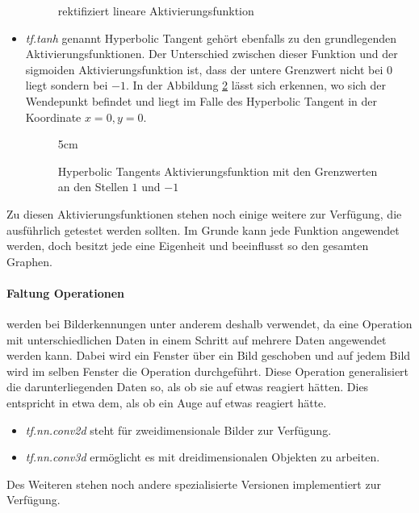 \begin{itemize}
\begin{figure}[ht!]
{
	}
	\caption{rektifiziert lineare Aktivierungsfunktion}
	\label{fig:rektifiziert lineare Aktivierungsfunktion}
\end{figure}
	\item \textit{tf.tanh} genannt Hyperbolic Tangent gehört ebenfalls zu den grundlegenden Aktivierungsfunktionen. 
	Der Unterschied zwischen dieser Funktion und der sigmoiden Aktivierungsfunktion ist, dass der untere Grenzwert nicht bei $0$ liegt sondern bei $-1$. 
	In der Abbildung \ref{fig:Hyperbolic Tangents Aktivierungsfunktion} lässt sich erkennen, wo sich der Wendepunkt befindet und liegt im Falle des Hyperbolic Tangent in der Koordinate $x = 0, y = 0$. 
\begin{figure}[ht!]
	\centering
	\resizebox {!} {5cm} { %
	}
	\caption{Hyperbolic Tangents Aktivierungsfunktion mit den Grenzwerten an den Stellen $1$ und $-1$}
	\label{fig:Hyperbolic Tangents Aktivierungsfunktion}
\end{figure}
\end{itemize}
Zu diesen Aktivierungsfunktionen stehen noch einige weitere zur Verfügung, die ausführlich getestet werden sollten. 
Im Grunde kann jede Funktion angewendet werden, doch besitzt jede eine Eigenheit und beeinflusst so den gesamten Graphen. 

\paragraph{Faltung Operationen} werden bei Bilderkennungen unter anderem deshalb verwendet, da eine Operation mit unterschiedlichen Daten in einem Schritt auf mehrere Daten angewendet werden kann. 
Dabei wird ein Fenster über ein Bild geschoben und auf jedem Bild wird im selben Fenster die Operation durchgeführt. 
Diese Operation generalisiert die darunterliegenden Daten so, als ob sie auf etwas reagiert hätten. 
Dies entspricht in etwa dem, als ob ein Auge auf etwas reagiert hätte. 
\begin{itemize}
	\item \textit{tf.nn.conv2d} steht für zweidimensionale Bilder zur Verfügung. 
	\item \textit{tf.nn.conv3d} ermöglicht es mit dreidimensionalen Objekten zu arbeiten.
\end{itemize}
Des Weiteren stehen noch andere spezialisierte Versionen implementiert zur Verfügung.

